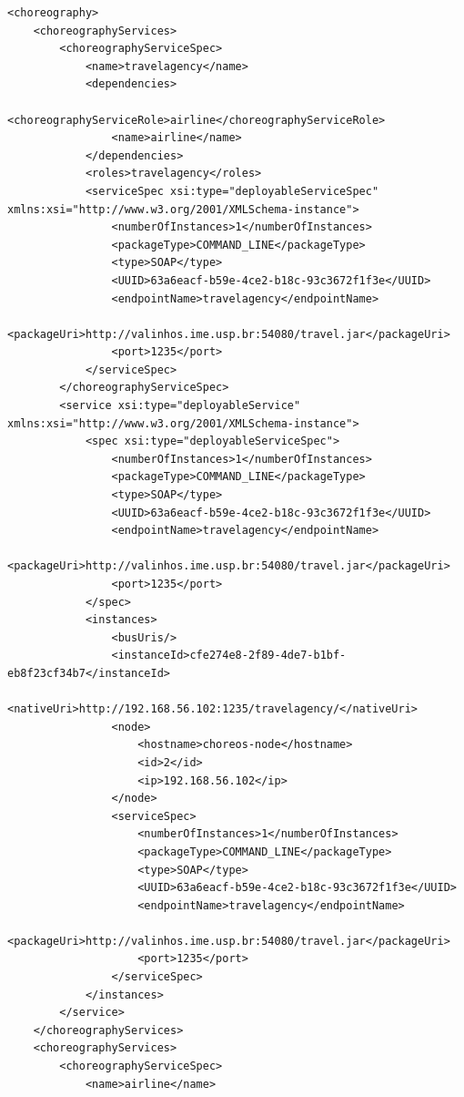 \documentclass[a4paper, 10pt]{article}
\begin{document}
{\begin{lstlisting}[caption=Choreography XML representation example, label=lst:chor_xml]
<choreography>
    <choreographyServices>
        <choreographyServiceSpec>
            <name>travelagency</name>
            <dependencies>
                <choreographyServiceRole>airline</choreographyServiceRole>
                <name>airline</name>
            </dependencies>
            <roles>travelagency</roles>
            <serviceSpec xsi:type="deployableServiceSpec" 
xmlns:xsi="http://www.w3.org/2001/XMLSchema-instance">
                <numberOfInstances>1</numberOfInstances>
                <packageType>COMMAND_LINE</packageType>
                <type>SOAP</type>
                <UUID>63a6eacf-b59e-4ce2-b18c-93c3672f1f3e</UUID>
                <endpointName>travelagency</endpointName>
                <packageUri>http://valinhos.ime.usp.br:54080/travel.jar</packageUri>
                <port>1235</port>
            </serviceSpec>
        </choreographyServiceSpec>
        <service xsi:type="deployableService" 
xmlns:xsi="http://www.w3.org/2001/XMLSchema-instance">
            <spec xsi:type="deployableServiceSpec">
                <numberOfInstances>1</numberOfInstances>
                <packageType>COMMAND_LINE</packageType>
                <type>SOAP</type>
                <UUID>63a6eacf-b59e-4ce2-b18c-93c3672f1f3e</UUID>
                <endpointName>travelagency</endpointName>
                <packageUri>http://valinhos.ime.usp.br:54080/travel.jar</packageUri>
                <port>1235</port>
            </spec>
            <instances>
                <busUris/>
                <instanceId>cfe274e8-2f89-4de7-b1bf-eb8f23cf34b7</instanceId>
                <nativeUri>http://192.168.56.102:1235/travelagency/</nativeUri>
                <node>
                    <hostname>choreos-node</hostname>
                    <id>2</id>
                    <ip>192.168.56.102</ip>
                </node>
                <serviceSpec>
                    <numberOfInstances>1</numberOfInstances>
                    <packageType>COMMAND_LINE</packageType>
                    <type>SOAP</type>
                    <UUID>63a6eacf-b59e-4ce2-b18c-93c3672f1f3e</UUID>
                    <endpointName>travelagency</endpointName>
                    <packageUri>http://valinhos.ime.usp.br:54080/travel.jar</packageUri>
                    <port>1235</port>
                </serviceSpec>
            </instances>
        </service>
    </choreographyServices>
    <choreographyServices>
        <choreographyServiceSpec>
            <name>airline</name>

\end{lstlisting}}
\end{document}
